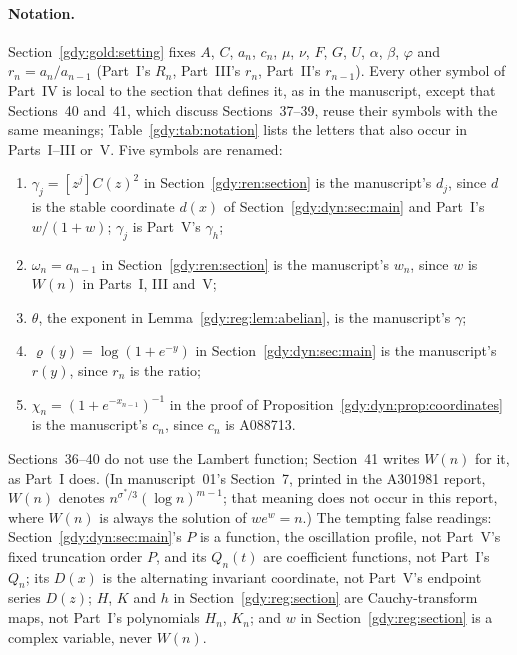 \documentclass[11pt]{article}
\numberwithin{equation}{section}
\theoremstyle{definition}
\theoremstyle{remark}
\begin{document}
\paragraph{Notation.}
Section~\ref{gdy:gold:setting} fixes $A$, $C$, $a_n$, $c_n$, $\mu$,
$\nu$, $F$, $G$, $U$, $\alpha$, $\beta$, $\varphi$ and
$r_n=a_n/a_{n-1}$ (Part~I's $R_n$, Part~III's $r_n$, Part~II's
$r_{n-1}$). Every other symbol of Part~IV is local to the section that
defines it, as in the manuscript, except that Sections~40 and~41, which
discuss Sections~37--39, reuse their symbols with the same meanings;
Table~\ref{gdy:tab:notation} lists the
letters that also occur in Parts~I--III or~V. Five symbols are renamed:
\begin{enumerate}[nosep]
\item $\gamma_j=[z^j]C(z)^2$ in Section~\ref{gdy:ren:section} is the
manuscript's $d_j$, since $d$ is the stable coordinate $d(x)$ of
Section~\ref{gdy:dyn:sec:main} and Part~I's $w/(1+w)$; $\gamma_j$ is
Part~V's $\gamma_h$;
\item $\omega_n=a_{n-1}$ in Section~\ref{gdy:ren:section} is the
manuscript's $w_n$, since $w$ is $W(n)$ in Parts~I, III and~V;
\item $\theta$, the exponent in Lemma~\ref{gdy:reg:lem:abelian}, is the
manuscript's $\gamma$;
\item $\varrho(y)=\log(1+e^{-y})$ in Section~\ref{gdy:dyn:sec:main} is
the manuscript's $r(y)$, since $r_n$ is the ratio;
\item $\chi_n=(1+e^{-x_{n-1}})^{-1}$ in the proof of
Proposition~\ref{gdy:dyn:prop:coordinates} is the manuscript's $c_n$,
since $c_n$ is A088713.
\end{enumerate}
Sections~36--40 do not use the Lambert function; Section~41 writes
$W(n)$ for it, as Part~I does. (In manuscript~01's
Section~7, printed in the A301981 report, $W(n)$ denotes
$n^{\sigma^*/3}(\log n)^{m-1}$; that meaning does not occur in this
report, where $W(n)$ is always the solution of $we^w=n$.) The tempting
false readings: Section~\ref{gdy:dyn:sec:main}'s $P$ is a function, the
oscillation profile, not Part~V's fixed truncation order $P$, and its
$Q_n(t)$ are coefficient functions, not Part~I's $Q_n$; its $D(x)$ is the
alternating invariant coordinate, not Part~V's endpoint series $D(z)$;
$H$, $K$ and $h$ in Section~\ref{gdy:reg:section} are Cauchy-transform
maps, not Part~I's polynomials $H_n$, $K_n$; and $w$ in
Section~\ref{gdy:reg:section} is a complex variable, never $W(n)$.
\end{document}
